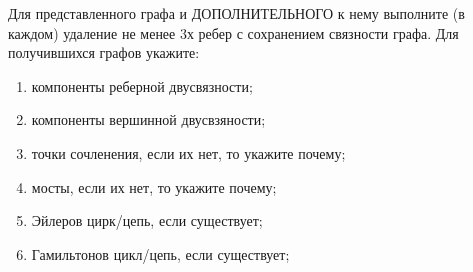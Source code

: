 \question
Для представленного графа и ДОПОЛНИТЕЛЬНОГО к нему выполните (в каждом) удаление не менее 3х ребер с сохранением связности графа. 
Для получившихся графов укажите: 
\begin{enumerate}
\item компоненты реберной двусвязности;
\item компоненты вершинной двусвзяности;
\item точки сочленения, если их нет, то укажите почему;
\item мосты, если их нет, то укажите почему;
\item Эйлеров цирк/цепь, если существует;
\item Гамильтонов цикл/цепь, если существует;
\end{enumerate}
\begin{figure}[h]

\begin{minipage}[h]{0.55\linewidth}
\end{minipage}
\begin{minipage}[h]{0.45\linewidth}
\end{minipage}
\end{figure}

